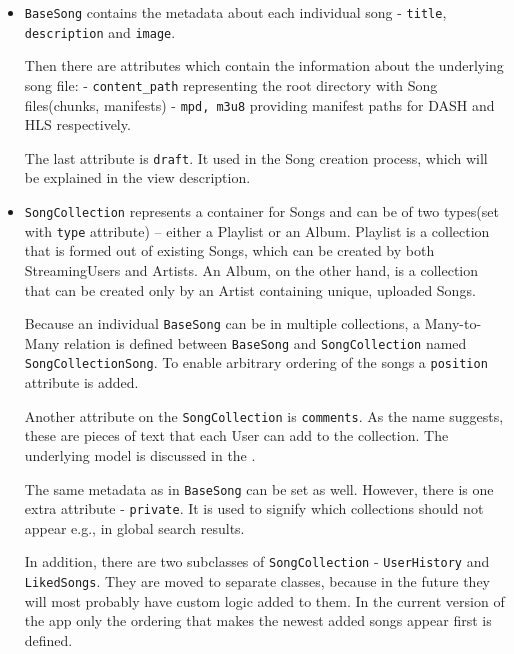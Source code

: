 \begin{itemize}

    \item
    \texttt{BaseSong} contains the metadata about each individual song - \texttt{title},
    \texttt{description} and \texttt{image}.

    Then there are attributes which contain the information about the underlying song file:
    - \texttt{content\_path} representing the root directory with Song files(chunks, manifests)
    - \texttt{mpd, m3u8} providing manifest paths for DASH and HLS respectively.

    The last attribute is \texttt{draft}. It used in the Song creation process, which will be explained in the
    view description.

    \item
    \texttt{SongCollection} represents a container for Songs and can be of two types(set with \texttt{type} attribute)
    -- either a Playlist or an Album.
    Playlist is a collection that is formed out of existing Songs, which can be created by both StreamingUsers
    and Artists. An Album, on the other hand, is a collection that can be created only by an Artist
    containing unique, uploaded Songs.

    Because an individual \texttt{BaseSong} can be in multiple collections, a Many-to-Many relation is defined between
    \texttt{BaseSong} and \texttt{SongCollection} named \texttt{SongCollectionSong}.
    To enable arbitrary ordering of the songs a \texttt{position} attribute is added.

    Another attribute on the \texttt{SongCollection} is \texttt{comments}.
    As the name suggests, these are pieces of text that each User can add to the collection. The underlying
    model is discussed in the .

    The same metadata as in \texttt{BaseSong} can be set as well.
    However, there is one extra attribute - \texttt{private}.
    It is used to signify which collections should not appear e.g., in global search results.

    In addition, there are two subclasses of \texttt{SongCollection} - \texttt{UserHistory} and \texttt{LikedSongs}.
    They are moved to separate classes, because in the future they will most probably have custom logic added to them.
    In the current version of the app only the ordering that makes the newest added songs appear first is defined.

\end{itemize}

